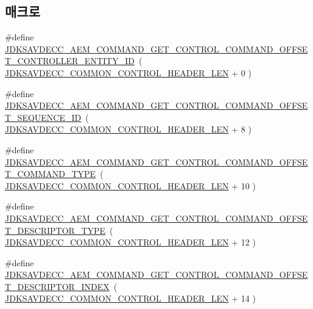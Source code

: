 \subsection*{매크로}
\begin{DoxyCompactItemize}
\item 
\#define \hyperlink{group__command__get__control_ga88069ef3bf9591f48a585df13288d162}{J\+D\+K\+S\+A\+V\+D\+E\+C\+C\+\_\+\+A\+E\+M\+\_\+\+C\+O\+M\+M\+A\+N\+D\+\_\+\+G\+E\+T\+\_\+\+C\+O\+N\+T\+R\+O\+L\+\_\+\+C\+O\+M\+M\+A\+N\+D\+\_\+\+O\+F\+F\+S\+E\+T\+\_\+\+C\+O\+N\+T\+R\+O\+L\+L\+E\+R\+\_\+\+E\+N\+T\+I\+T\+Y\+\_\+\+ID}~( \hyperlink{group__jdksavdecc__avtp__common__control__header_gaae84052886fb1bb42f3bc5f85b741dff}{J\+D\+K\+S\+A\+V\+D\+E\+C\+C\+\_\+\+C\+O\+M\+M\+O\+N\+\_\+\+C\+O\+N\+T\+R\+O\+L\+\_\+\+H\+E\+A\+D\+E\+R\+\_\+\+L\+EN} + 0 )
\item 
\#define \hyperlink{group__command__get__control_ga2856fc75982593f16a7c368607ed986d}{J\+D\+K\+S\+A\+V\+D\+E\+C\+C\+\_\+\+A\+E\+M\+\_\+\+C\+O\+M\+M\+A\+N\+D\+\_\+\+G\+E\+T\+\_\+\+C\+O\+N\+T\+R\+O\+L\+\_\+\+C\+O\+M\+M\+A\+N\+D\+\_\+\+O\+F\+F\+S\+E\+T\+\_\+\+S\+E\+Q\+U\+E\+N\+C\+E\+\_\+\+ID}~( \hyperlink{group__jdksavdecc__avtp__common__control__header_gaae84052886fb1bb42f3bc5f85b741dff}{J\+D\+K\+S\+A\+V\+D\+E\+C\+C\+\_\+\+C\+O\+M\+M\+O\+N\+\_\+\+C\+O\+N\+T\+R\+O\+L\+\_\+\+H\+E\+A\+D\+E\+R\+\_\+\+L\+EN} + 8 )
\item 
\#define \hyperlink{group__command__get__control_ga96570dd5109b7f580db5dda9d26097e7}{J\+D\+K\+S\+A\+V\+D\+E\+C\+C\+\_\+\+A\+E\+M\+\_\+\+C\+O\+M\+M\+A\+N\+D\+\_\+\+G\+E\+T\+\_\+\+C\+O\+N\+T\+R\+O\+L\+\_\+\+C\+O\+M\+M\+A\+N\+D\+\_\+\+O\+F\+F\+S\+E\+T\+\_\+\+C\+O\+M\+M\+A\+N\+D\+\_\+\+T\+Y\+PE}~( \hyperlink{group__jdksavdecc__avtp__common__control__header_gaae84052886fb1bb42f3bc5f85b741dff}{J\+D\+K\+S\+A\+V\+D\+E\+C\+C\+\_\+\+C\+O\+M\+M\+O\+N\+\_\+\+C\+O\+N\+T\+R\+O\+L\+\_\+\+H\+E\+A\+D\+E\+R\+\_\+\+L\+EN} + 10 )
\item 
\#define \hyperlink{group__command__get__control_gab6f8d9ccbc87bb8a57077d41cd8fe7a2}{J\+D\+K\+S\+A\+V\+D\+E\+C\+C\+\_\+\+A\+E\+M\+\_\+\+C\+O\+M\+M\+A\+N\+D\+\_\+\+G\+E\+T\+\_\+\+C\+O\+N\+T\+R\+O\+L\+\_\+\+C\+O\+M\+M\+A\+N\+D\+\_\+\+O\+F\+F\+S\+E\+T\+\_\+\+D\+E\+S\+C\+R\+I\+P\+T\+O\+R\+\_\+\+T\+Y\+PE}~( \hyperlink{group__jdksavdecc__avtp__common__control__header_gaae84052886fb1bb42f3bc5f85b741dff}{J\+D\+K\+S\+A\+V\+D\+E\+C\+C\+\_\+\+C\+O\+M\+M\+O\+N\+\_\+\+C\+O\+N\+T\+R\+O\+L\+\_\+\+H\+E\+A\+D\+E\+R\+\_\+\+L\+EN} + 12 )
\item 
\#define \hyperlink{group__command__get__control_ga809a6ba30d84b8c4918a6547961cbb6a}{J\+D\+K\+S\+A\+V\+D\+E\+C\+C\+\_\+\+A\+E\+M\+\_\+\+C\+O\+M\+M\+A\+N\+D\+\_\+\+G\+E\+T\+\_\+\+C\+O\+N\+T\+R\+O\+L\+\_\+\+C\+O\+M\+M\+A\+N\+D\+\_\+\+O\+F\+F\+S\+E\+T\+\_\+\+D\+E\+S\+C\+R\+I\+P\+T\+O\+R\+\_\+\+I\+N\+D\+EX}~( \hyperlink{group__jdksavdecc__avtp__common__control__header_gaae84052886fb1bb42f3bc5f85b741dff}{J\+D\+K\+S\+A\+V\+D\+E\+C\+C\+\_\+\+C\+O\+M\+M\+O\+N\+\_\+\+C\+O\+N\+T\+R\+O\+L\+\_\+\+H\+E\+A\+D\+E\+R\+\_\+\+L\+EN} + 14 )

\end{DoxyCompactItemize}
